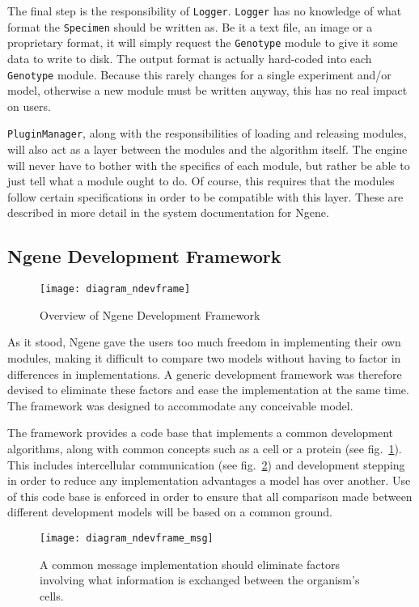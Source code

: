 The final step is the responsibility of \texttt{Logger}. \texttt{Logger} has no knowledge of what format the \texttt{Specimen} should be written as. Be it a text file, an image or a proprietary format, it will simply request the \texttt{Genotype} module to give it some data to write to disk. The output format is actually hard-coded into each \texttt{Genotype} module. Because this rarely changes for a single experiment and/or model, otherwise a new module must be written anyway, this has no real impact on users.

\texttt{PluginManager}, along with the responsibilities of loading and releasing modules, will also act as a layer between the modules and the algorithm itself. The engine will never have to bother with the specifics of each module, but rather be able to just tell what a module ought to do. Of course, this requires that the modules follow certain specifications in order to be compatible with this layer. These are described in more detail in the system documentation for Ngene.


\subsection{Ngene Development Framework}
\begin{figure}[!ht]
	\centering
	\texttt{[image: diagram\_ndevframe]}
	\caption{Overview of Ngene Development Framework}
	\label{fig:diagram_ndevframe}
\end{figure}

As it stood, Ngene gave the users too much freedom in implementing their own modules, making it difficult to compare two models without having to factor in differences in implementations. A generic development framework was therefore devised to eliminate these factors and ease the implementation at the same time. The framework was designed to accommodate any conceivable model.

The framework provides a code base that implements a common development algorithms, along with common concepts such as a cell or a protein (see fig.~\ref{fig:diagram_ndevframe}). This includes intercellular communication (see fig.~\ref{fig:diagram_ndevframe_msg}) and development stepping in order to reduce any implementation advantages a model has over another. Use of this code base is enforced in order to ensure that all comparison made between different development models will be based on a common ground.

\begin{figure}[!ht]
	\centering
	\texttt{[image: diagram\_ndevframe\_msg]}
	\caption{A common message implementation should eliminate factors involving what information is exchanged between the organism's cells.}
	\label{fig:diagram_ndevframe_msg}
\end{figure}

